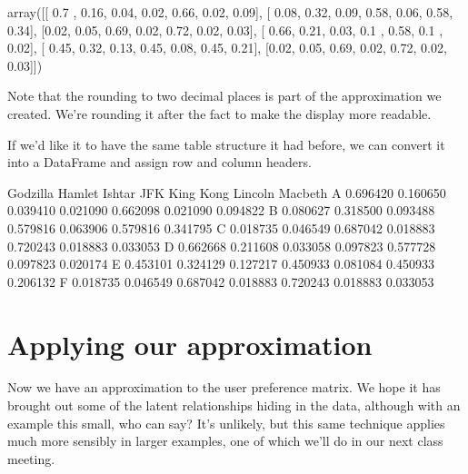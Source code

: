 \documentclass[letterpaper,10pt,english]{sphinxmanual}
\begin{document}
\begin{sphinxVerbatim}[commandchars=\\\{\}]
array([[ 0.7 ,  0.16,  0.04, \PYGZhy{}0.02,  0.66, \PYGZhy{}0.02, \PYGZhy{}0.09],
       [ 0.08,  0.32,  0.09,  0.58, \PYGZhy{}0.06,  0.58,  0.34],
       [\PYGZhy{}0.02,  0.05,  0.69, \PYGZhy{}0.02,  0.72, \PYGZhy{}0.02,  0.03],
       [ 0.66,  0.21,  0.03,  0.1 ,  0.58,  0.1 , \PYGZhy{}0.02],
       [ 0.45,  0.32, \PYGZhy{}0.13,  0.45,  0.08,  0.45,  0.21],
       [\PYGZhy{}0.02,  0.05,  0.69, \PYGZhy{}0.02,  0.72, \PYGZhy{}0.02,  0.03]])
\end{sphinxVerbatim}

Note that the rounding to two decimal places is  part of the approximation we created.  We’re rounding it after the fact to make the display more readable.

If we’d like it to have the same table structure it had before, we can convert it into a DataFrame and assign row and column headers.

\begin{sphinxVerbatim}[commandchars=\\\{\}]
    
  
  
\end{sphinxVerbatim}

\begin{sphinxVerbatim}[commandchars=\\\{\}]
   Godzilla    Hamlet    Ishtar       JFK  King Kong   Lincoln   Macbeth
A  0.696420  0.160650  0.039410 \PYGZhy{}0.021090   0.662098 \PYGZhy{}0.021090 \PYGZhy{}0.094822
B  0.080627  0.318500  0.093488  0.579816  \PYGZhy{}0.063906  0.579816  0.341795
C \PYGZhy{}0.018735  0.046549  0.687042 \PYGZhy{}0.018883   0.720243 \PYGZhy{}0.018883  0.033053
D  0.662668  0.211608  0.033058  0.097823   0.577728  0.097823 \PYGZhy{}0.020174
E  0.453101  0.324129 \PYGZhy{}0.127217  0.450933   0.081084  0.450933  0.206132
F \PYGZhy{}0.018735  0.046549  0.687042 \PYGZhy{}0.018883   0.720243 \PYGZhy{}0.018883  0.033053
\end{sphinxVerbatim}


\section{Applying our approximation}
\label{\detokenize{chapter-16-matrices:applying-our-approximation}}
Now we have an approximation to the user preference matrix.  We hope it has brought out some of the latent relationships hiding in the data, although with an example this small, who can say?  It’s unlikely, but this same technique applies much more sensibly in larger examples, one of which we’ll do in our next class meeting.
\end{document}
